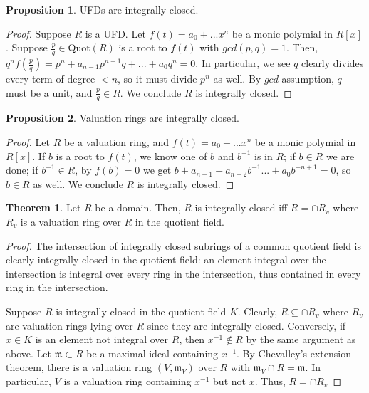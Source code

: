 \documentclass{article}
\theoremstyle{definition}
\newtheorem{theorem}{Theorem}[section]
\theoremstyle{definition}
\theoremstyle{definition}
\newtheorem{proposition}{Proposition}[section]
\theoremstyle{definition}
\theoremstyle{definition}
\theoremstyle{definition}
\theoremstyle{definition}
\begin{document}
\begin{tcolorbox}[colback=blue!5!white,colframe=blue!30!white]
\begin{proposition}
UFDs are integrally closed.
\end{proposition}
\end{tcolorbox}
\begin{proof}
    Suppose $R$ is a UFD. Let $f(t)=a_0+...x^n$ be a monic polymial in $R[x]$. Suppose $\frac{p}{q}\in \textrm{Quot}(R)$ is a root to $f(t)$ with $gcd(p,q)=1$. Then, $q^nf(\frac{p}{q})=p^n+a_{n-1}p^{n-1}q+...+a_0q^n=0$. In particular, we see $q$ clearly divides every term of degree $<n$, so it must divide $p^n$ as well. By $gcd$ assumption, $q$ must be a unit, and $\frac{p}{q}\in R$. We conclude $R$ is integrally closed.
\end{proof}


\begin{tcolorbox}[colback=blue!5!white,colframe=blue!30!white]
\begin{proposition}
    Valuation rings are integrally closed.
\end{proposition}
\end{tcolorbox}
\begin{proof}
 Let $R$ be a valuation ring, and $f(t)=a_0+...x^n$ be a monic polymial in $R[x]$. If $b$ is a root to $f(t)$, we know one of $b$ and $b^{-1}$ is in $R$; if $b\in R$ we are done; if $b ^{-1}\in R$, by $f(b)=0$ we get $b+a_{n-1}+a_{n-2}b^{-1}...+a_0b ^{-n+1}=0$, so $b\in R$ as well. We conclude $R$ is integrally closed.
\end{proof}
\begin{tcolorbox}[colback=red!5!white,colframe=red!30!white]

\begin{theorem}
Let $R$ be a domain. Then, $R$ is integrally closed iff $R=\cap R_v$ where $R_v$ is a valuation ring over $R$ in the quotient field.  
\end{theorem}
\end{tcolorbox}
\begin{proof}

 The intersection of integrally closed subrings of a common quotient field is clearly integrally closed in the quotient field: an element integral over the intersection is integral over every ring in the intersection, thus contained in every ring in the intersection. 

Suppose $R$ is integrally closed in the quotient field $K$. Clearly, $R\subseteq \cap R_v$ where $R_v$ are valuation rings lying over $R$ since they are integrally closed. Conversely, if $x\in K$ is an element not integral over $R$, then $x^{-1}\not \in R$ by the same argument as above. Let $\mathfrak{m}\subset R$ be a maximal ideal containing $x ^{-1}$. By Chevalley's extension theorem, there is a valuation ring $(V,\mathfrak{m}_V)$ over $R$ with $\mathfrak{m}_V\cap R= \mathfrak{m}$. In particular, $V$ is a valuation ring containing $x^{-1}$ but not $x$. Thus, $R= \cap R_v$

\end{proof}
\end{document}
